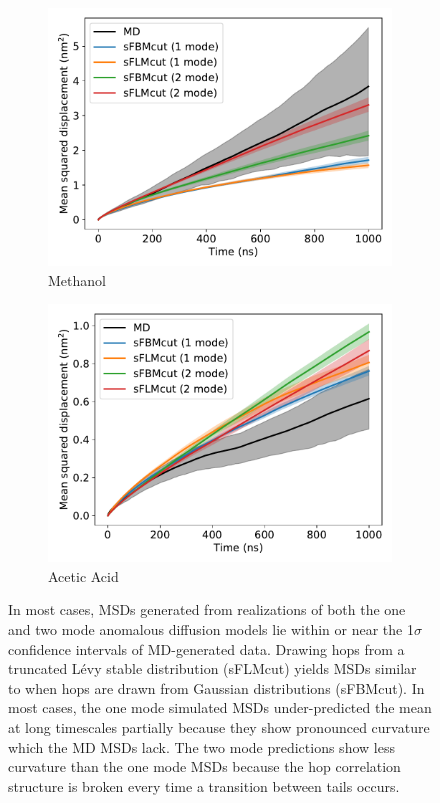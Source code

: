 \documentclass[journal=jctcce,manuscript=article]{achemso}
\begin{document}
\begin{figure}
\begin{subfigure}{0.45\textwidth}
  \includegraphics[width=\textwidth]{bothmode_msd_comparison_MET.pdf}
  \caption{Methanol}\label{fig:bothmode_msd_comparison_MET}
  \end{subfigure}
  \begin{subfigure}{0.45\textwidth}
  \includegraphics[width=\textwidth]{bothmode_msd_comparison_ACH.pdf}
  \caption{Acetic Acid}\label{fig:bothmode_msd_comparison_ACH}
  \end{subfigure}
  \caption{In most cases, MSDs generated from realizations of both the one and
	  two mode anomalous diffusion models lie within or near the 1$\sigma$ confidence
	  intervals of MD-generated data. Drawing hops from a truncated L\'evy
	  stable distribution (sFLMcut) yields MSDs similar to when hops are
	  drawn from Gaussian distributions (sFBMcut). In most cases, the one
	  mode simulated MSDs under-predicted the mean at long timescales
	  partially because they show pronounced curvature which the MD MSDs
	  lack. The two mode predictions show less curvature than the one mode
	  MSDs because the hop correlation structure is broken every time a
	  transition between tails occurs.
  }\label{fig:anomalous_msds}
  \end{figure}
\end{document}
